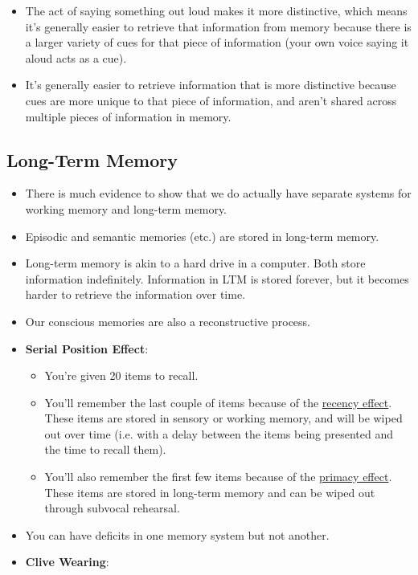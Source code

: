 \documentclass[]{article}
\newcommand{\lecture}[1]{\marginpar{{\footnotesize $\leftarrow$ \underline{#1}}}}
\begin{document}
\begin{itemize}
				\item The act of saying something out loud makes it more distinctive, which means it's generally easier to retrieve that information from memory because there is a larger variety of cues for that piece of information (your own voice saying it aloud acts as a cue).
				\item It's generally easier to retrieve information that is more distinctive because cues are more unique to that piece of information, and aren't shared across multiple pieces of information in memory.
			\end{itemize}

		\subsection{Long-Term Memory}
			\begin{itemize}
				\item There is much evidence to show that we do actually have separate systems for working memory and long-term memory.
				\item Episodic and semantic memories (etc.) are stored in long-term memory.
				\item Long-term memory is akin to a hard drive in a computer. Both store information indefinitely. Information in LTM is stored forever, but it becomes harder to retrieve the information over time.
				\item Our conscious memories are also a reconstructive process.
				\item \textbf{Serial Position Effect}:
					\begin{itemize} 
						\item You're given 20 items to recall.
						\item You'll remember the last couple of items because of the \underline{recency effect}. These items are stored in sensory or working memory, and will be wiped out over time (i.e. with a delay between the items being presented and the time to recall them).
						\item You'll also remember the first few items because of the \underline{primacy effect}. These items are stored in long-term memory and can be wiped out through subvocal rehearsal.
					\end{itemize}
				\item You can have deficits in one memory system but not another. \lecture{February 7, 2013}
				\item \textbf{Clive Wearing}:
					\begin{itemize}

\end{itemize}
\end{itemize}
\end{document}
